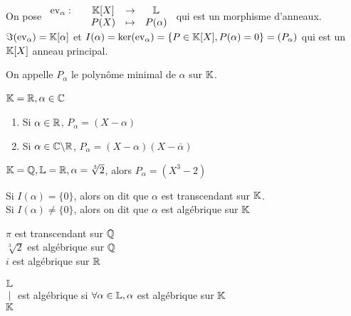 \documentclass[]{report}
\begin{document}
    \begin{re}{}{}
        On pose $\begin{array}{ccccc} \text{ev}_\alpha : & & \mathbb{K}[X] & \to & \mathbb{L} \\ & & P(X) & \mapsto & P(\alpha) \end{array}$ qui est un morphisme d'anneaux. $\Im (\text{ev}_\alpha)=\mathbb{K}[\alpha]$ et $I(\alpha)=\ker(\text{ev}_\alpha)=\{P\in\mathbb{K}[X],P(\alpha)=0\}=(P_\alpha)$ qui est un $\mathbb{K}[X]$ anneau principal.
    \end{re}

    \begin{df}{}{}
        On appelle $P_\alpha$ le polynôme minimal de $\alpha$ sur $\mathbb{K}$.
    \end{df}

    \begin{ex}{}{}
        $\mathbb{K}=\mathbb{R},\alpha\in \mathbb{C}$
        \begin{enumerate}
            \item Si $\alpha\in \mathbb{R}$, $P_\alpha=(X-\alpha)$
            \item Si $\alpha \in \mathbb{C}\backslash \mathbb{R}$, $P_\alpha=(X-\alpha)(X-\overline{\alpha})$
        \end{enumerate}
    \end{ex}

    \begin{ex}{}{}
        $\mathbb{K}=\mathbb{Q},\mathbb{L}=\mathbb{R},\alpha=\sqrt[3]{2}$, alors $P_\alpha=(X^3-2)$
    \end{ex}

    \begin{df}{}{}
        Si $I(\alpha)=\{0\}$, alors on dit que $\alpha$ est transcendant sur $\mathbb{K}$.\\
        Si $I(\alpha)\neq \{0\}$, alors on dit que $\alpha$ est algébrique sur $\mathbb{K}$
    \end{df}

    \begin{ex}{}{}
        $\pi$ est transcendant sur $\mathbb{Q}$\\
        $\sqrt[3]{2}$ est algébrique sur $\mathbb{Q}$\\
        $i$ est algébrique sur $\mathbb{R}$
    \end{ex}

    \begin{df}{}{}
        $\begin{matrix}
            \mathbb{L}\\
            |\\
            \mathbb{K}
        \end{matrix}$ est algébrique  si $\forall \alpha\in \mathbb{L},\alpha$ est algébrique sur $\mathbb{K}$
    \end{df}
\end{document}
